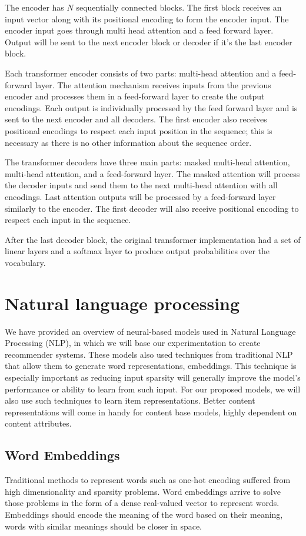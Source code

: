 \documentclass{tex_files/kththesis}
\begin{document}
The encoder has $N$ sequentially connected blocks. The first block receives an input vector along with its positional encoding to form the encoder input. The encoder input goes through multi head attention and a feed forward layer. Output will be sent to the next encoder block or decoder if it's the last encoder block. 

Each transformer encoder consists of two parts: multi-head attention and a feed-forward layer. The attention mechanism receives inputs from the previous encoder and processes them in a feed-forward layer to create the output encodings. Each output is individually processed by the feed forward layer and is sent to the next encoder and all decoders. The first encoder also receives positional encodings to respect each input position in the sequence; this is necessary as there is no other information about the sequence order.

The transformer decoders have three main parts: masked multi-head attention, multi-head attention, and a feed-forward layer. The masked attention will process the decoder inputs and send them to the next multi-head attention with all encodings. Last attention outputs will be processed by a feed-forward layer similarly to the encoder. The first decoder will also receive positional encoding to respect each input in the sequence.

After the last decoder block, the original transformer implementation had a set of linear layers and a softmax layer to produce output probabilities over the vocabulary.

\section{Natural language processing}
We have provided an overview of neural-based models used in Natural Language Processing (NLP), in which we will base our experimentation to create recommender systems. These models also used techniques from traditional NLP that allow them to generate word representations, embeddings. This technique is especially important as reducing input sparsity will generally improve the model's performance or ability to learn from such input. For our proposed models, we will also use such techniques to learn item representations. Better content representations will come in handy for content base models, highly dependent on content attributes.

\subsection{Word Embeddings}\label{Embeddings}
Traditional methods to represent words such as one-hot encoding suffered from high dimensionality and sparsity problems. Word embeddings arrive to solve those problems in the form of a dense real-valued vector to represent words. Embeddings should encode the meaning of the word based on their meaning, words with similar meanings should be closer in space.
\end{document}
